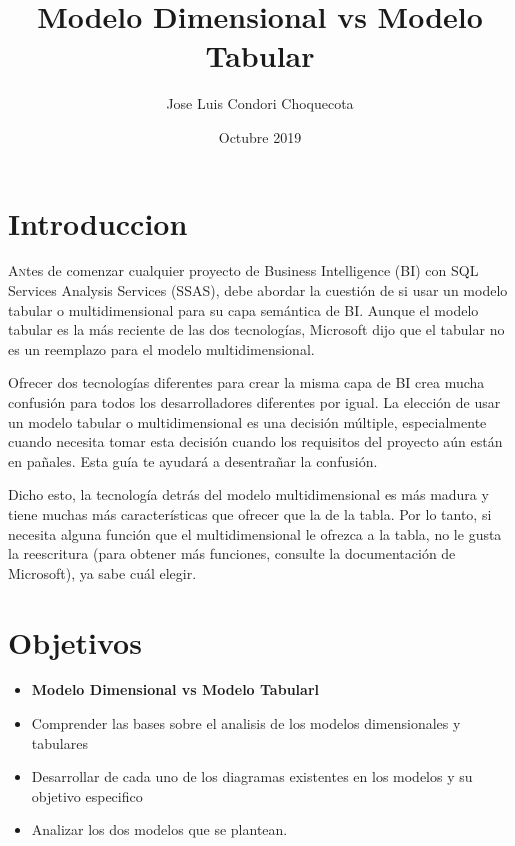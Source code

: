 \documentclass[twoside,twocolumn]{article}
\title{Modelo Dimensional vs Modelo Tabular}
\author{Jose  Luis Condori Choquecota\\
}
\date{Octubre 2019}
\begin{document}
\maketitle


\section{Introduccion}
\lettrine[nindent=0em,lines=3]{A}ntes de comenzar cualquier proyecto de Business Intelligence (BI) con SQL Services Analysis Services (SSAS), debe abordar la cuestión de si usar un modelo tabular o multidimensional para su capa semántica de BI. Aunque el modelo tabular es la más reciente de las dos tecnologías, Microsoft dijo que el tabular no es un reemplazo para el modelo multidimensional.

Ofrecer dos tecnologías diferentes para crear la misma capa de BI crea mucha confusión para todos los desarrolladores diferentes por igual. La elección de usar un modelo tabular o multidimensional es una decisión múltiple, especialmente cuando necesita tomar esta decisión cuando los requisitos del proyecto aún están en pañales. Esta guía te ayudará a desentrañar la confusión.

Dicho esto, la tecnología detrás del modelo multidimensional es más madura y tiene muchas más características que ofrecer que la de la tabla. Por lo tanto, si necesita alguna función que el multidimensional le ofrezca a la tabla, no le gusta la reescritura (para obtener más funciones, consulte la documentación de Microsoft), ya sabe cuál elegir.






\section{Objetivos}

\begin{itemize}

\item \textbf{ Modelo Dimensional vs Modelo Tabularl}
\\
\item Comprender las bases sobre el analisis de los modelos dimensionales y tabulares
\item Desarrollar de cada uno de los diagramas existentes en los modelos y su objetivo especifico
\item Analizar los dos modelos que se plantean.
\\



\end{itemize}
\end{document}
